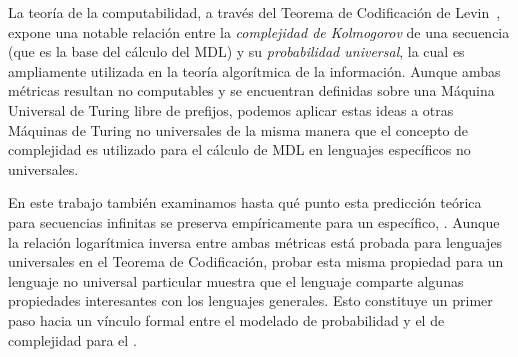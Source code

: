 
La teoría de la computabilidad, a través del Teorema de Codificación de Levin~\cite{levin1974laws}, expone una notable relación entre la {\em complejidad de Kolmogorov} de una secuencia (que es la base del cálculo del MDL) y su {\em probabilidad universal}, la cual es ampliamente utilizada en la teoría algorítmica de la información. Aunque ambas métricas resultan no computables y se encuentran definidas sobre una Máquina Universal de Turing libre de prefijos, podemos aplicar estas ideas a otras Máquinas de Turing no universales de la misma manera que el concepto de complejidad es utilizado para el cálculo de MDL en lenguajes específicos no universales. 


En este trabajo también examinamos hasta qué punto esta predicción teórica para secuencias infinitas se preserva empíricamente para un \lot específico, \gramgeo. Aunque la relación logarítmica inversa entre ambas métricas está probada para lenguajes universales en el Teorema de Codificación, probar esta misma propiedad para un lenguaje no universal particular muestra que el lenguaje comparte algunas propiedades interesantes con los lenguajes generales. Esto constituye un primer paso hacia un vínculo formal entre el modelado de probabilidad y el de complejidad para el \lot.

